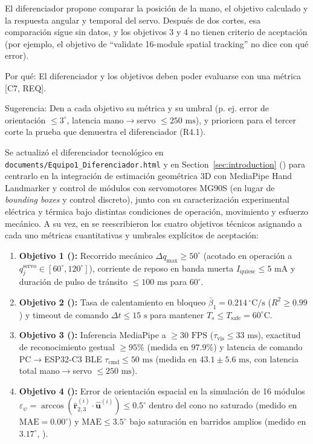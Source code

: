 \documentclass{LabDSTresponse}
\begin{document}
{El diferenciador propone comparar la posición de la mano, el objetivo calculado y la respuesta angular y temporal del servo. Después de dos cortes, esa comparación sigue sin datos, y los objetivos 3 y 4 no tienen criterio de aceptación (por ejemplo, el objetivo de “validate 16-module spatial tracking” no dice con qué error).

Por qué: El diferenciador y los objetivos deben poder evaluarse con una métrica [C7, REQ].

Sugerencia: Den a cada objetivo su métrica y su umbral (p. ej. error de orientación $\le 3^\circ$, latencia mano$\to$servo $\le 250\text{ ms}$), y prioricen para el tercer corte la prueba que demuestra el diferenciador (R4.1).}
{Se actualizó el diferenciador tecnológico en \texttt{documents/Equipo1\_Diferenciador.html} y en Section~\ref{sec:introduction} () para centrarlo en la integración de estimación geométrica 3D con MediaPipe Hand Landmarker y control de módulos con servomotores MG90S (en lugar de \textit{bounding boxes} y control discreto), junto con su caracterización experimental eléctrica y térmica bajo distintas condiciones de operación, movimiento y esfuerzo mecánico. A su vez, en  se reescribieron los cuatro objetivos técnicos asignando a cada uno métricas cuantitativas y umbrales explícitos de aceptación:
\begin{enumerate}
    \item \textbf{Objetivo 1 ():} Recorrido mecánico $\Delta q_{\max} \ge 50^\circ$ (acotado en operación a $q_j^{\text{servo}} \in [60^\circ, 120^\circ]$), corriente de reposo en banda muerta $I_{\text{quiesc}} \le 5\text{ mA}$ y duración de pulso de tránsito $\le 100\text{ ms}$ para $60^\circ$.
    \item \textbf{Objetivo 2 ():} Tasa de calentamiento en bloqueo $\bar{\beta}_1 = 0.214\,^\circ\text{C/s}$ ($R^2 \ge 0.99$) y timeout de comando $\Delta t \le 15\text{ s}$ para mantener $T_s \le T_{\text{safe}} = 60^\circ\text{C}$.
    \item \textbf{Objetivo 3 ():} Inferencia MediaPipe a $\ge 30\text{ FPS}$ ($\tau_{\text{vis}} \le 33\text{ ms}$), exactitud de reconocimiento gestual $\ge 95\%$ (medida en $97.9\%$) y latencia de comando PC$\to$ESP32-C3 BLE $\tau_{\text{cmd}} \le 50\text{ ms}$ (medida en $43.1 \pm 5.6\text{ ms}$, con latencia total mano$\to$servo $\le 250\text{ ms}$).
    \item \textbf{Objetivo 4 ():} Error de orientación espacial en la simulación de 16 módulos $\varepsilon_\psi = \arccos(\hat{\mathbf{r}}_{2,3}^{(i)} \cdot \hat{\mathbf{u}}^{(i)}) \le 0.5^\circ$ dentro del cono no saturado (medido en $\text{MAE} = 0.00^\circ$) y $\text{MAE} \le 3.5^\circ$ bajo saturación en barridos amplios (medido en $3.17^\circ$, ).
\end{enumerate}}
\end{document}
